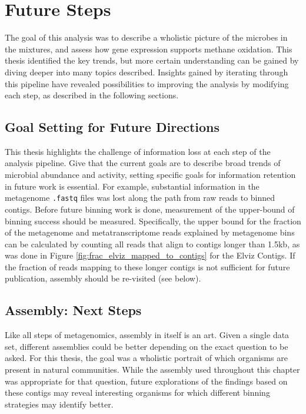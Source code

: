 \section{Future Steps}
\label{chA_future_steps}


The goal of this analysis was to describe a wholistic picture of the microbes in the mixtures, and assess how gene expression supports methane oxidation.
This thesis identified the key trends, but more certain understanding can be gained by diving deeper into many topics described.
Insights gained by iterating through this pipeline have revealed possibilities to improving the analysis by modifying each step, as described in the following sections.

\subsection{Goal Setting for Future Directions}

This thesis highlights the challenge of information loss at each step of the analysis pipeline.
Give that the current goals are to describe broad trends of microbial abundance and activity, setting specific goals for information retention in future work is essential.
For example, substantial information in the metagenome \texttt{.fastq} files was lost along the path from raw reads to binned contigs.
Before future binning work is done, measurement of the upper-bound of binning success should be measured.
Specifically, the upper bound for the fraction of the metagenome and metatranscriptome reads explained by metagenome bins can be calculated by counting all reads that align to contigs longer than 1.5kb, as was done in Figure \ref{fig:frac_elviz_mapped_to_contigs} for the Elviz Contigs.
If the fraction of reads mapping to these longer contigs is not sufficient for future publication, assembly should be re-visited (see below).


\subsection{Assembly: Next Steps}

Like all steps of metagenomics, assembly in itself is an art.
Given a single data set, different assemblies could be better depending on the exact question to be asked.
For this thesis, the goal was a wholistic portrait of which organisms are present in natural communities.
While the assembly used throughout this chapter was appropriate for that question, future explorations of the findings based on these contigs may reveal interesting organisms for which different binning strategies may identify better.

